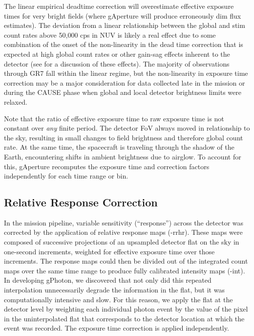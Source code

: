 \documentclass[preprint]{aastex}
\begin{document}
The linear empirical deadtime correction will overestimate effective exposure times for very bright fields (where gAperture will produce erroneously dim flux estimates). The deviation from a linear relationship between the global and stim count rates above 50,000 cps in NUV is likely a real effect due to some combination of the onset of the non-linearity in the dead time correction that is expected at high global count rates or other gain-sag effects inherent to the detector (see \citet{mor2007} for a discussion of these effects). The majority of observations through GR7 fall within the linear regime, but the non-linearity in exposure time correction may be a major consideration for data collected late in the mission or during the CAUSE phase when global and local detector brightness limits were relaxed.

Note that the ratio of effective exposure time to raw exposure time is not constant over \emph{any} finite period. The detector FoV always moved in relationship to the sky, resulting in small changes to field brightness and therefore global count rate. At the same time, the spacecraft is traveling through the shadow of the Earth, encountering shifts in ambient brightness due to airglow. To account for this, gAperture recomputes the exposure time and correction factors independently for each time range or bin.

\subsection{Relative Response Correction}
\label{relresponsecorr}
In the mission pipeline, variable sensitivity (``response'') across the detector was corrected by the application of relative response maps (-rrhr). These maps were composed of successive projections of an upsampled detector flat on the sky in one-second increments, weighted for effective exposure time over those increments. The response maps could then be divided out of the integrated count maps over the same time range to produce fully calibrated intensity maps (-int). In developing gPhoton, we discovered that not only did this repeated interpolation unnecessarily degrade the information in the flat, but it was computationally intensive and slow. For this reason, we apply the flat at the detector level by weighting each individual photon event by the value of the pixel in the uninterpolated flat that corresponds to the detector location at which the event was recorded. The exposure time correction is applied independently.
\end{document}
